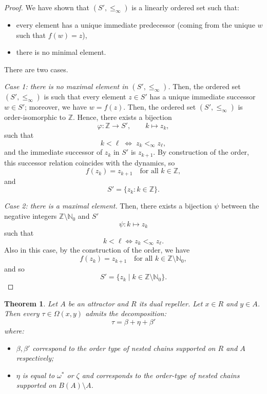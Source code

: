 \documentclass[10pt,a4paper]{article}
\theoremstyle{definition}
\theoremstyle{remark}
\theoremstyle{plain}
\newtheorem{thm}[defi]{Theorem}
\begin{document}
\begin{proof}
We have shown that $(S',\le_\infty)$ is a linearly ordered set such that:
\begin{itemize}
\item every element has a unique immediate predecessor (coming from the unique $w$ such that $f(w)=z$),
\item there is no minimal element.
\end{itemize}
There are two cases.

\smallskip

\textit{Case 1: there is no maximal element in $(S',\le_\infty)$.} Then, the ordered set $(S',\le_\infty)$ is such that every element $z\in S'$ has a unique immediate successor $w\in S'$; moreover, we have $w=f(z)$.
Then, the ordered set $(S',\le_\infty)$ is order-isomorphic to $\mathbb{Z}$. Hence, there exists a bijection
$$
\varphi:\mathbb{Z}\to S',\qquad k\mapsto z_k,
$$
such that
$$
k<\ell \;\Longleftrightarrow\; z_k<_\infty z_\ell,
$$
and the immediate successor of $z_k$ in $S'$ is $z_{k+1}$. By construction of the order, this successor relation coincides with the dynamics, so
$$
f(z_k)=z_{k+1}\quad\text{for all }k\in\mathbb{Z},
$$
and
$$
S'=\{z_k:k\in\mathbb{Z}\}.
$$

\smallskip

\textit{Case 2: there is a maximal element.} Then, there exists a bijection $\psi$ between the negative integers $\mathbb Z\setminus\mathbb N_0$ and $S'$
$$\psi:k\mapsto z_k$$
such that
$$k<\ell\iff z_k<_\infty z_\ell.$$
Also in this case, by the construction of the order, we have
$$f(z_k)=z_{k+1}\quad\text{for all }k\in\mathbb Z\setminus\mathbb N_0,$$
and so
$$S'=\{z_k\mid k\in\mathbb Z\setminus\mathbb N_0\}.$$



\end{proof}


\begin{thm}
Let $A$ be an attractor and $R$ its dual repeller. Let $x\in R$ and $y\in A$. Then every $\tau\in \Omega(x,y)$ admits the decomposition: $$\tau = \beta + \eta + \beta'$$
where: 
\begin{itemize} 
\item $\beta, \beta'$ correspond to the order type of nested chains supported on $R$ and $A$ respectively;
\item $\eta$ is equal to $\omega^*$ or $\zeta$ and corresponds to the order-type of nested chains supported on $B(A)\setminus A$.
\end{itemize}

\end{thm}
\end{document}
